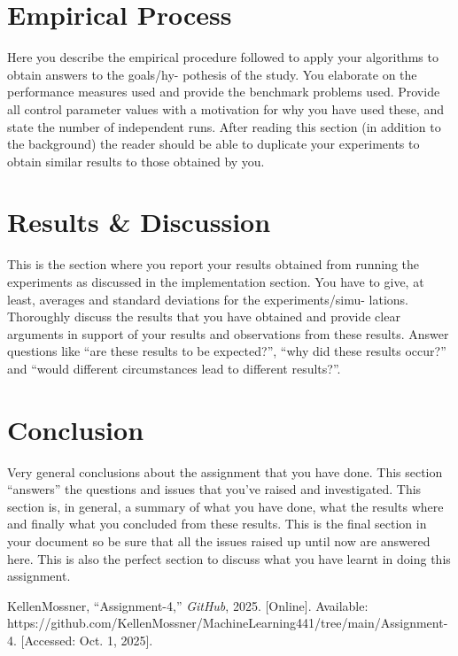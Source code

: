 \documentclass[conference]{IEEEtran}
\begin{document}
	\section{Empirical Process}\label{EP}
	Here you describe the empirical procedure followed to apply your algorithms to obtain answers to the goals/hy-
	pothesis of the study. You elaborate on the performance measures used and provide the benchmark problems
	used. Provide all control parameter values with a motivation for why you have used these, and state the number
	of independent runs. After reading this section (in addition to the background) the reader should be able to
	duplicate your experiments to obtain similar results to those obtained by you.
	
	\section{Results \& Discussion}\label{RD}
	This is the section where you report your results obtained from running the experiments as discussed in the
	implementation section. You have to give, at least, averages and standard deviations for the experiments/simu-
	lations. Thoroughly discuss the results that you have obtained and provide clear arguments in support of your
	results and observations from these results. Answer questions like “are these results to be expected?”, “why did
	these results occur?” and “would different circumstances lead to different results?”.
	
	\section{Conclusion}\label{C}
	Very general conclusions about the assignment that you have done. This section “answers” the questions and
	issues that you’ve raised and investigated. This section is, in general, a summary of what you have done, what
	the results where and finally what you concluded from these results. This is the final section in your document
	so be sure that all the issues raised up until now are answered here. This is also the perfect section to discuss
	what you have learnt in doing this assignment.
	
	\begin{thebibliography}{00}
		 KellenMossner, ``Assignment-4,'' \textit{GitHub}, 2025. [Online]. Available: https://github.com/KellenMossner/MachineLearning441/tree/main/Assignment-4. [Accessed: Oct. 1, 2025].
	\end{thebibliography}
	
\end{document}
